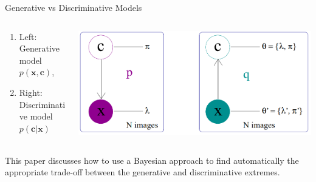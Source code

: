 \documentclass[11pt,pdf,hyperref={unicode}]{beamer}
\begin{document}
\begin{frame}{Generative vs Discriminative Models}

\begin{columns}
\begin{column}{0.3\textwidth}

\begin{enumerate}[1)]
    \item Left: Generative model $p(\mathbf{x}, \mathbf{c})$, 
    \item Right: Discriminative model $p(\mathbf{c}|\mathbf{x})$
\end{enumerate}
\end{column}
\begin{column}{0.7\textwidth}
	\includegraphics[width=1\textwidth]{pres_img.png}      
\end{column}
\end{columns}
\bigskip
This paper discusses how to use
a Bayesian approach to find automatically the appropriate trade-off between
the generative and discriminative extremes.
\end{frame}
\end{document}
